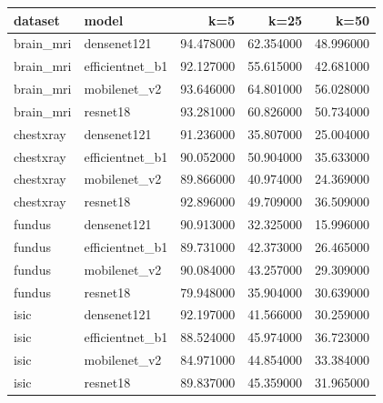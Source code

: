 \begin{tabular}{llrrr}
\toprule
dataset & model & k=5 & k=25 & k=50 \\
\midrule
brain_mri & densenet121 & 94.478000 & 62.354000 & 48.996000 \\
brain_mri & efficientnet_b1 & 92.127000 & 55.615000 & 42.681000 \\
brain_mri & mobilenet_v2 & 93.646000 & 64.801000 & 56.028000 \\
brain_mri & resnet18 & 93.281000 & 60.826000 & 50.734000 \\
chestxray & densenet121 & 91.236000 & 35.807000 & 25.004000 \\
chestxray & efficientnet_b1 & 90.052000 & 50.904000 & 35.633000 \\
chestxray & mobilenet_v2 & 89.866000 & 40.974000 & 24.369000 \\
chestxray & resnet18 & 92.896000 & 49.709000 & 36.509000 \\
fundus & densenet121 & 90.913000 & 32.325000 & 15.996000 \\
fundus & efficientnet_b1 & 89.731000 & 42.373000 & 26.465000 \\
fundus & mobilenet_v2 & 90.084000 & 43.257000 & 29.309000 \\
fundus & resnet18 & 79.948000 & 35.904000 & 30.639000 \\
isic & densenet121 & 92.197000 & 41.566000 & 30.259000 \\
isic & efficientnet_b1 & 88.524000 & 45.974000 & 36.723000 \\
isic & mobilenet_v2 & 84.971000 & 44.854000 & 33.384000 \\
isic & resnet18 & 89.837000 & 45.359000 & 31.965000 \\
\bottomrule
\end{tabular}
